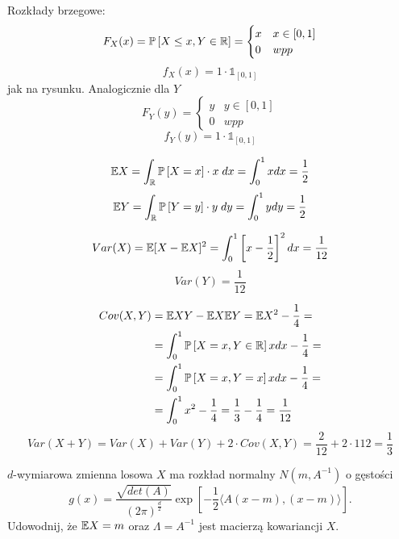 \documentclass{article}
\begin{document}

Rozkłady brzegowe:
$$F_X(x)=\prob{X\leq x, Y\in\R}=\begin{cases}x&x\in[0,1]\\0&wpp\end{cases}$$
$$f_X(x)=1\cdot\mathds{1}_{[0,1]}$$
jak na rysunku. Analogicznie dla $Y$
$$F_Y(y)=\begin{cases}y&y\in[0,1]\\0&wpp\end{cases}$$
$$f_Y(y)=1\cdot\mathds{1}_{[0,1]}$$

$$\e X=\int_\R\prob{X=x}\cdot x\;dx=\int_0^1xdx=\frac{1}{2}$$
$$\e Y=\int_\R\prob{Y=y}\cdot y\;dy=\int_0^1ydy=\frac{1}{2}$$

$$Var(X)=\mathbb{E}[X-\mathbb{E} X]^2=\int_0^1\left[x-\frac{1}{2}\right]^2dx=\frac{1}{12}$$
$$Var(Y)=\frac{1}{12}$$

\begin{align*}
    Cov(X,Y)&=\e XY-\e X\e Y=\e X^2-\frac{1}{4}=\\
    &=\int_0^1\prob{X=x,Y\in\R}xdx-\frac{1}{4}=\\
    &=\int_0^1\prob{X=x,Y=x}xdx-\frac{1}{4}=\\
    &=\int_0^1x^2-\frac{1}{4}=\frac{1}{3}-\frac{1}{4}=\frac{1}{12}
\end{align*}
$$Var(X+Y)=Var(X)+Var(Y)+2\cdot Cov(X, Y)=\frac{2}{12}+2\cdot{1}{12}=\frac{1}{3}$$


\begin{problem}{}
$d$-wymiarowa zmienna losowa $X$ ma rozkład normalny $N(m,A^{-1})$ o gęstości
$$g(x)=\frac{\sqrt{det(A)}}{(2\pi)^{\frac{d}{2}}}\exp\left[-\frac{1}{2}\langle A(x-m),(x-m)\rangle\right].$$
Udowodnij, że $\mathbb{E} X=m$ oraz $\Lambda=A^{-1}$ jest macierzą kowariancji $X$. 
\end{problem}
\end{document}
